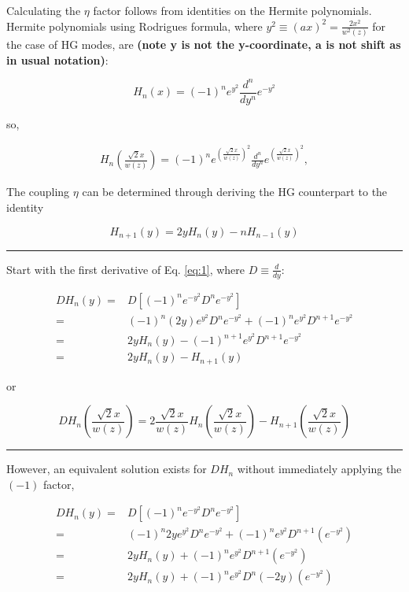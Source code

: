 \documentclass[aps,twoside,secnumarabic,balancelastpage,amsmath,amssymb,nofootinbib,hyperref=pdftex]{revtex4}
\begin{document}
Calculating the $\eta$ factor follows from identities on the Hermite polynomials. Hermite polynomials using Rodrigues formula, where $y^2 \equiv (ax)^2 = \frac{2 x^2}{w^2(z)}$ for the case of HG modes, are \textbf{(note y is not the y-coordinate, a is not shift as in usual notation)}:

\begin{equation}\label{eq:1}
	H_n(x) = 
		(-1)^n e^{y^2} \frac{d^n}{dy^n}e^{-y^2}
\end{equation}

so,

\begin{align*}
	H_n(\frac{\sqrt{2}x}{w(z)} )
	= 
		(-1)^n e^{({\frac{ \sqrt{2} x}{w(z)}})^2} \frac{d^n}{dy^n}e^{({\frac{ \sqrt{2} x}{w(z)}})^2},
\end{align*}

The coupling $\eta$ can be determined through deriving the HG counterpart to the identity

\begin{equation}\label{id}
	H_{n+1}(y) = 2y H_n(y) - nH_{n-1}(y)
\end{equation}

\rule{\textwidth}{0.4pt}

Start with the first derivative of Eq. \ref{eq:1}, where $D \equiv \frac{d}{dy}$:

\begin{align*}
	D H_n(y) =&
	D [ (-1)^n e^{-y^2} D^n e^{-y^2} ]
	\\=&
		(-1)^n (2y) e^{y^2} D^n e^{-y^2}
		+
		(-1)^n e^{y^2} D^{n+1} e^{-y^2}
		\\=&
		2y H_n(y)
		-
		(-1)^{n+1} e^{y^2} D^{n+1}e^{-y^2}
		\\=&
		2y H_n(y)	
		-
		H_{n+1}(y)	
\end{align*}

or

\begin{equation}\label{res1}
D H_n(\frac{\sqrt{2}x}{w(z)})
=
		2\frac{\sqrt{2}x}{w(z)} H_n(\frac{\sqrt{2}x}{w(z)})	
		-
		H_{n+1}(\frac{\sqrt{2}x}{w(z)})	
\end{equation}

\rule{\textwidth}{0.4pt}

However, an equivalent solution exists for $D H_n$ without immediately applying the $(-1)$ factor,


\begin{align*}
D H_n(y) =&
	D [ (-1)^n e^{-y^2} D^n e^{-y^2} ]
\\=&
(-1)^n
	2ye^{y^2}
	D^n e^{-y^2}
	+
	(-1)^n
	e^{y^2}
	D^{n+1}
	(e^{-y^2})
	\\=&
	2y H_n(y)
	+
	(-1)^n
	e^{y^2}
	D^{n+1}
	(e^{-y^2})
	\\=&
		2y  H_n(y)
	+
	(-1)^n
	e^{y^2}
	D^{n}
	(-2y)
	(e^{-y^2})
\end{align*}
\end{document}
